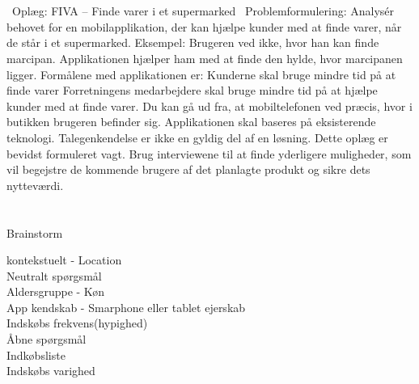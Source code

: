 \documentclass[12pt]{article}
\begin{document}
\section*{}
 \ Oplæg: FIVA – Finde varer i et supermarked
 \ Problemformulering: Analysér behovet for en mobilapplikation, der kan hjælpe kunder med at finde varer, når de står i et
supermarked. Eksempel: Brugeren ved ikke, hvor han kan finde marcipan. Applikationen hjælper
ham med at finde den hylde, hvor marcipanen ligger.
Formålene med applikationen er:
  Kunderne skal bruge mindre tid på at finde varer
  Forretningens medarbejdere skal bruge mindre tid på at hjælpe kunder med at finde varer.
Du kan gå ud fra, at mobiltelefonen ved præcis, hvor i butikken brugeren befinder sig.
Applikationen skal baseres på eksisterende teknologi. Talegenkendelse er ikke en gyldig del af en
løsning.
Dette oplæg er bevidst formuleret vagt. Brug interviewene til at finde yderligere muligheder, som
vil begejstre de kommende brugere af det planlagte produkt og sikre dets nytteværdi.

\section*{}
 Brainstorm

  kontekstuelt - Location \\

  Neutralt sp\o rgsm\aa l \\

  Aldersgruppe - K\o n \\

  App kendskab - Smarphone eller tablet ejerskab \\ 

  Indsk\o bs frekvens(hypighed) \\

  \AA bne sp\o rgsm\aa l \\ 

  Indk\o bsliste \\
  
  Indsk\o bs varighed\\
 
    
\end{document}
